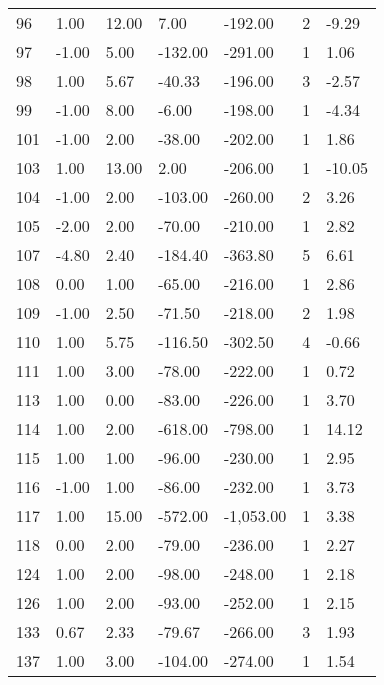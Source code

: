 \begin{appendices}
\begin{longtable}[c]{@{}lllllll@{}}
\rowcolor[HTML]{FFCCC9}
96 & 1.00 & 12.00 & 7.00 & -192.00 & 2 & -9.29 \\
\rowcolor[HTML]{FFCCC9}
97 & -1.00 & 5.00 & -132.00 & -291.00 & 1 & 1.06 \\
\rowcolor[HTML]{FFCCC9}
98 & 1.00 & 5.67 & -40.33 & -196.00 & 3 & -2.57 \\
\rowcolor[HTML]{FFCCC9}
99 & -1.00 & 8.00 & -6.00 & -198.00 & 1 & -4.34 \\
\rowcolor[HTML]{FFCCC9}
101 & -1.00 & 2.00 & -38.00 & -202.00 & 1 & 1.86 \\
\rowcolor[HTML]{FFCCC9}
103 & 1.00 & 13.00 & 2.00 & -206.00 & 1 & -10.05 \\
\rowcolor[HTML]{FFCCC9}
104 & -1.00 & 2.00 & -103.00 & -260.00 & 2 & 3.26 \\
\rowcolor[HTML]{FFCCC9}
105 & -2.00 & 2.00 & -70.00 & -210.00 & 1 & 2.82 \\
\rowcolor[HTML]{FFCCC9}
107 & -4.80 & 2.40 & -184.40 & -363.80 & 5 & 6.61 \\
\rowcolor[HTML]{FFCCC9}
108 & 0.00 & 1.00 & -65.00 & -216.00 & 1 & 2.86 \\
\rowcolor[HTML]{FFCCC9}
109 & -1.00 & 2.50 & -71.50 & -218.00 & 2 & 1.98 \\
\rowcolor[HTML]{FFCCC9}
110 & 1.00 & 5.75 & -116.50 & -302.50 & 4 & -0.66 \\
\rowcolor[HTML]{FFCCC9}
111 & 1.00 & 3.00 & -78.00 & -222.00 & 1 & 0.72 \\
\rowcolor[HTML]{FFCCC9}
113 & 1.00 & 0.00 & -83.00 & -226.00 & 1 & 3.70 \\
\rowcolor[HTML]{FFCCC9}
114 & 1.00 & 2.00 & -618.00 & -798.00 & 1 & 14.12 \\
\rowcolor[HTML]{FFCCC9}
115 & 1.00 & 1.00 & -96.00 & -230.00 & 1 & 2.95 \\
\rowcolor[HTML]{FFCCC9}
116 & -1.00 & 1.00 & -86.00 & -232.00 & 1 & 3.73 \\
\rowcolor[HTML]{FFCCC9}
117 & 1.00 & 15.00 & -572.00 & -1,053.00 & 1 & 3.38 \\
\rowcolor[HTML]{FFCCC9}
118 & 0.00 & 2.00 & -79.00 & -236.00 & 1 & 2.27 \\
\rowcolor[HTML]{FFCCC9}
124 & 1.00 & 2.00 & -98.00 & -248.00 & 1 & 2.18 \\
\rowcolor[HTML]{FFCCC9}
126 & 1.00 & 2.00 & -93.00 & -252.00 & 1 & 2.15 \\
\rowcolor[HTML]{FFCCC9}
133 & 0.67 & 2.33 & -79.67 & -266.00 & 3 & 1.93 \\
\rowcolor[HTML]{FFCCC9}
137 & 1.00 & 3.00 & -104.00 & -274.00 & 1 & 1.54 \\

\end{longtable}
\end{appendices}
